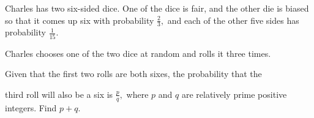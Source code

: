 Charles has two six-sided dice. One of the dice is fair, and the other die is biased so that it comes up six with probability $\tfrac23,$ and each of the other five sides has probability $\tfrac{1}{15}.$

 Charles chooses one of the two dice at random and rolls it three times.

 Given that the first two rolls are both sixes, the probability that the

 third roll will also be a six is $\tfrac{p}{q},$ where $p$ and $q$ are relatively prime positive integers. Find $p+q$.